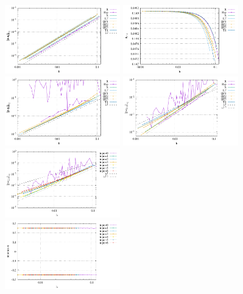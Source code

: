 \begin{center}
\includegraphics[width=5cm]{python_codes/fieldstone_78/results/errors_u_exp7.pdf}
\includegraphics[width=5cm]{python_codes/fieldstone_78/results/vrms_exp7.pdf} \\
\includegraphics[width=5cm]{python_codes/fieldstone_78/results/errors_p_exp7.pdf}
\includegraphics[width=5cm]{python_codes/fieldstone_78/results/errors_q1_exp7.pdf}
\includegraphics[width=5cm]{python_codes/fieldstone_78/results/errors_q2_exp7.pdf}\\
\includegraphics[width=5cm]{python_codes/fieldstone_78/results/stats_u_exp7.pdf}

\end{center}
